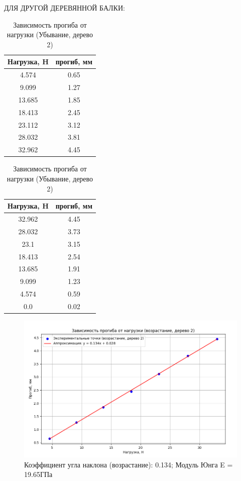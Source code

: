 \documentclass[a4paper, 12pt]{article}
\begin{document}
ДЛЯ ДРУГОЙ ДЕРЕВЯННОЙ БАЛКИ:

\begin{table}[h]
\centering
\begin{minipage}{0.45\textwidth}
\centering
\caption{Зависимость прогиба от нагрузки (Возрастание, дерево 2)}
\begin{tabular}{|c|c|}
\hline
Нагрузка, H & прогиб, мм \\
\hline
4.574 & 0.65 \\
\hline
9.099 & 1.27 \\
\hline
13.685 & 1.85 \\
\hline
18.413 & 2.45 \\
\hline
23.112 & 3.12 \\
\hline
28.032 & 3.81 \\
\hline
32.962 & 4.45 \\
\hline
\end{tabular}
\end{minipage}
\hfill
\begin{minipage}{0.45\textwidth}
\centering
\caption{Зависимость прогиба от нагрузки (Убывание, дерево 2)}
\begin{tabular}{|c|c|}
\hline
Нагрузка, H & прогиб, мм \\
\hline
32.962 & 4.45 \\
\hline
28.032 & 3.73 \\
\hline
23.1 & 3.15 \\
\hline
18.413 & 2.54 \\
\hline
13.685 & 1.91 \\
\hline
9.099 & 1.23 \\
\hline
4.574 & 0.59 \\
\hline
0.0 & 0.02 \\
\hline
\end{tabular}
\end{minipage}
\end{table}

\begin{figure}[h]
\centering
\includegraphics[width=0.8\linewidth]{G5.png}
\caption{Коэффициент угла наклона (возрастание): 0.134; Модуль Юнга E = 19.65ГПа}
\label{fig:increase}
\end{figure}
\end{document}
